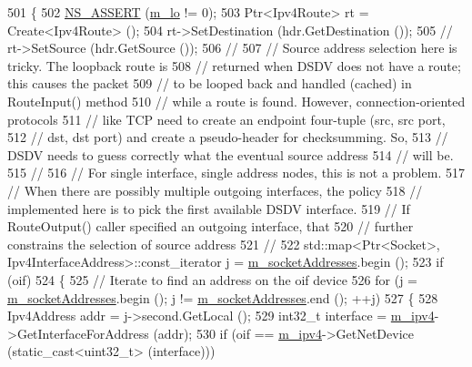 \begin{DoxyCode}
501 \{
502   \hyperlink{assert_8h_a6dccdb0de9b252f60088ce281c49d052}{NS\_ASSERT} (\hyperlink{classns3_1_1dsdv_1_1RoutingProtocol_a793deb930065a91d037ed2930e756528}{m\_lo} != 0);
503   Ptr<Ipv4Route> rt = Create<Ipv4Route> ();
504   rt->SetDestination (hdr.GetDestination ());
505   \textcolor{comment}{// rt->SetSource (hdr.GetSource ());}
506   \textcolor{comment}{//}
507   \textcolor{comment}{// Source address selection here is tricky.  The loopback route is}
508   \textcolor{comment}{// returned when DSDV does not have a route; this causes the packet}
509   \textcolor{comment}{// to be looped back and handled (cached) in RouteInput() method}
510   \textcolor{comment}{// while a route is found. However, connection-oriented protocols}
511   \textcolor{comment}{// like TCP need to create an endpoint four-tuple (src, src port,}
512   \textcolor{comment}{// dst, dst port) and create a pseudo-header for checksumming.  So,}
513   \textcolor{comment}{// DSDV needs to guess correctly what the eventual source address}
514   \textcolor{comment}{// will be.}
515   \textcolor{comment}{//}
516   \textcolor{comment}{// For single interface, single address nodes, this is not a problem.}
517   \textcolor{comment}{// When there are possibly multiple outgoing interfaces, the policy}
518   \textcolor{comment}{// implemented here is to pick the first available DSDV interface.}
519   \textcolor{comment}{// If RouteOutput() caller specified an outgoing interface, that}
520   \textcolor{comment}{// further constrains the selection of source address}
521   \textcolor{comment}{//}
522   std::map<Ptr<Socket>, Ipv4InterfaceAddress>::const\_iterator j = 
      \hyperlink{classns3_1_1dsdv_1_1RoutingProtocol_a9f3be507604655079b145f063cf036fd}{m\_socketAddresses}.begin ();
523   \textcolor{keywordflow}{if} (oif)
524     \{
525       \textcolor{comment}{// Iterate to find an address on the oif device}
526       \textcolor{keywordflow}{for} (j = \hyperlink{classns3_1_1dsdv_1_1RoutingProtocol_a9f3be507604655079b145f063cf036fd}{m\_socketAddresses}.begin (); j != 
      \hyperlink{classns3_1_1dsdv_1_1RoutingProtocol_a9f3be507604655079b145f063cf036fd}{m\_socketAddresses}.end (); ++j)
527         \{
528           Ipv4Address addr = j->second.GetLocal ();
529           int32\_t \textcolor{keyword}{interface }= \hyperlink{classns3_1_1dsdv_1_1RoutingProtocol_a955477c7f38e64762a264c24e3762af6}{m\_ipv4}->GetInterfaceForAddress (addr);
530           \textcolor{keywordflow}{if} (oif == \hyperlink{classns3_1_1dsdv_1_1RoutingProtocol_a955477c7f38e64762a264c24e3762af6}{m\_ipv4}->GetNetDevice (static\_cast<uint32\_t> (interface)))

\end{DoxyCode}
